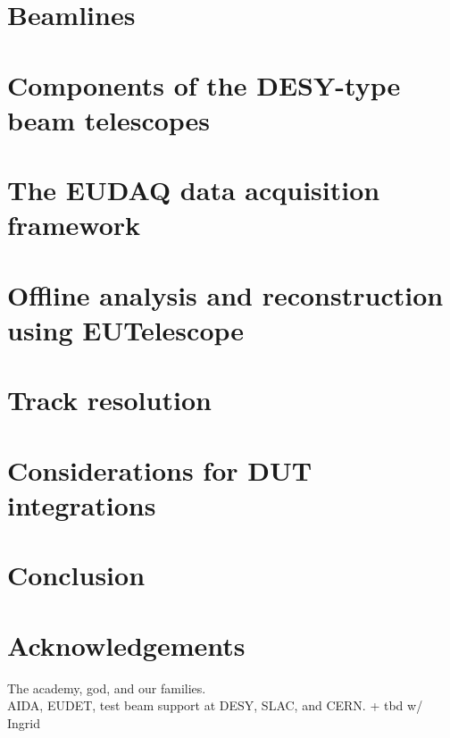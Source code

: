 \documentclass[a4paper,10pt]{scrartcl}
\begin{document}
\section{Beamlines}
\label{sec:beamlines}


\section{Components of the DESY-type beam telescopes}
\label{sec:tscope}


\section{The EUDAQ data acquisition framework}
\label{sec:eudaq}


\section{Offline analysis and reconstruction using EUTelescope}
\label{sec:offline}


\section{Track resolution}
\label{sec:trackres}


\section{Considerations for DUT integrations}
\label{sec:dutintegration}


\section{Conclusion}
\label{sec:conclusion}



\section*{Acknowledgements}
The academy, god, and our families. \\
AIDA, EUDET, test beam support at DESY, SLAC, and CERN. + tbd w/ Ingrid

\small


\end{document}
